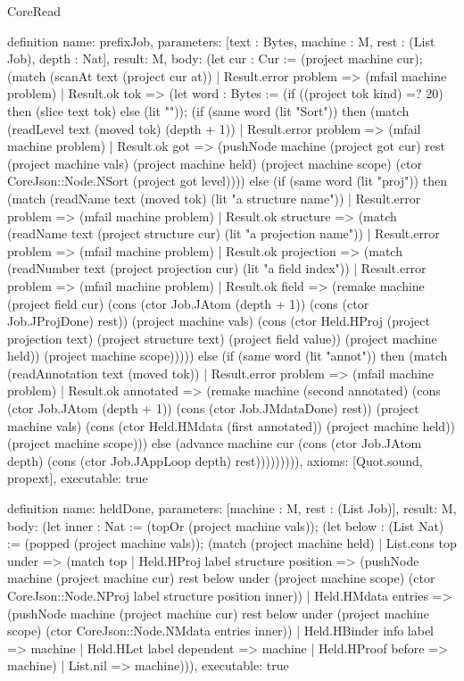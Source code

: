 \begin{lexlean}{CoreRead}
\begin{semanticmodule}
definition{
  name: prefixJob,
  parameters: [text : Bytes, machine : M, rest : (List Job), depth : Nat],
  result: M,
  body: (let cur : Cur := (project machine cur); (match (scanAt text (project cur at))
    | Result.error problem => (mfail machine problem)
    | Result.ok tok => (let word : Bytes := (if ((project tok kind) =? 20) then (slice text tok) else (lit "")); (if (same word (lit "Sort")) then (match (readLevel text (moved tok) (depth + 1))
      | Result.error problem => (mfail machine problem)
      | Result.ok got => (pushNode machine (project got cur) rest (project machine vals) (project machine held) (project machine scope) (ctor CoreJson::Node.NSort (project got level)))) else (if (same word (lit "proj")) then (match (readName text (moved tok) (lit "a structure name"))
      | Result.error problem => (mfail machine problem)
      | Result.ok structure => (match (readName text (project structure cur) (lit "a projection name"))
        | Result.error problem => (mfail machine problem)
        | Result.ok projection => (match (readNumber text (project projection cur) (lit "a field index"))
          | Result.error problem => (mfail machine problem)
          | Result.ok field => (remake machine (project field cur) (cons (ctor Job.JAtom (depth + 1)) (cons (ctor Job.JProjDone) rest)) (project machine vals) (cons (ctor Held.HProj (project projection text) (project structure text) (project field value)) (project machine held)) (project machine scope))))) else (if (same word (lit "annot")) then (match (readAnnotation text (moved tok))
      | Result.error problem => (mfail machine problem)
      | Result.ok annotated => (remake machine (second annotated) (cons (ctor Job.JAtom (depth + 1)) (cons (ctor Job.JMdataDone) rest)) (project machine vals) (cons (ctor Held.HMdata (first annotated)) (project machine held)) (project machine scope))) else (advance machine cur (cons (ctor Job.JAtom depth) (cons (ctor Job.JAppLoop depth) rest))))))))),
  axioms: [Quot.sound, propext],
  executable: true
}

definition{
  name: heldDone,
  parameters: [machine : M, rest : (List Job)],
  result: M,
  body: (let inner : Nat := (topOr (project machine vals)); (let below : (List Nat) := (popped (project machine vals)); (match (project machine held)
    | List.cons top under => (match top
      | Held.HProj label structure position => (pushNode machine (project machine cur) rest below under (project machine scope) (ctor CoreJson::Node.NProj label structure position inner))
      | Held.HMdata entries => (pushNode machine (project machine cur) rest below under (project machine scope) (ctor CoreJson::Node.NMdata entries inner))
      | Held.HBinder info label => machine
      | Held.HLet label dependent => machine
      | Held.HProof before => machine)
    | List.nil => machine))),
  executable: true
}


\end{semanticmodule}
\end{lexlean}

